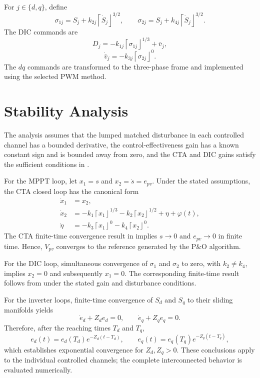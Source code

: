 \documentclass[preprint,12pt]{elsarticle}
\begin{document}
For $j\in\{d,q\}$, define
\begin{equation}
\sigma_{1j}=S_j+k_{2j}\left\lceil\dot S_j\right\rfloor^{3/2},\qquad
\sigma_{2j}=S_j+k_{4j}\left\lceil\dot S_j\right\rfloor^{3/2}.
\end{equation}
The DIC commands are
\begin{equation}
D_j=-k_{1j}\left\lceil\sigma_{1j}\right\rfloor^{1/3}+\bar v_j,
\end{equation}
\begin{equation}
\dot{\bar v}_j=-k_{3j}\left\lceil\sigma_{2j}\right\rfloor^0.
\end{equation}
The $dq$ commands are transformed to the three-phase frame and implemented using the selected PWM method.

\section{Stability Analysis}
\label{sec:stability}

The analysis assumes that the lumped matched disturbance in each controlled channel has a bounded derivative, the control-effectiveness gain has a known constant sign and is bounded away from zero, and the CTA and DIC gains satisfy the sufficient conditions in \cite{torres2017design,moreno2017discontinuous}.

For the MPPT loop, let $x_1=s$ and $x_2=\dot s=e_{pv}$. Under the stated assumptions, the CTA closed loop has the canonical form
\begin{equation}
\begin{aligned}
\dot x_1&=x_2,\\
\dot x_2&=-k_1\left\lceil x_1\right\rfloor^{1/3}-k_2\left\lceil x_2\right\rfloor^{1/2}+\eta+\varphi(t),\\
\dot\eta&=-k_3\left\lceil x_1\right\rfloor^0-k_4\left\lceil x_2\right\rfloor^0.
\end{aligned}
\end{equation}
The CTA finite-time convergence result in \cite{torres2017design} implies $s\to0$ and $e_{pv}\to0$ in finite time. Hence, $V_{pv}$ converges to the reference generated by the P\&O algorithm.

For the DIC loop, simultaneous convergence of $\sigma_1$ and $\sigma_2$ to zero, with $k_2\neq k_4$, implies $x_2=0$ and subsequently $x_1=0$. The corresponding finite-time result follows from \cite{moreno2017discontinuous} under the stated gain and disturbance conditions.

For the inverter loops, finite-time convergence of $S_d$ and $S_q$ to their sliding manifolds yields
\begin{equation}
\dot e_d+Z_de_d=0,\qquad \dot e_q+Z_qe_q=0.
\end{equation}
Therefore, after the reaching times $T_d$ and $T_q$,
\begin{equation}
e_d(t)=e_d(T_d)e^{-Z_d(t-T_d)},\qquad e_q(t)=e_q(T_q)e^{-Z_q(t-T_q)},
\end{equation}
which establishes exponential convergence for $Z_d,Z_q>0$. These conclusions apply to the individual controlled channels; the complete interconnected behavior is evaluated numerically.
\end{document}
